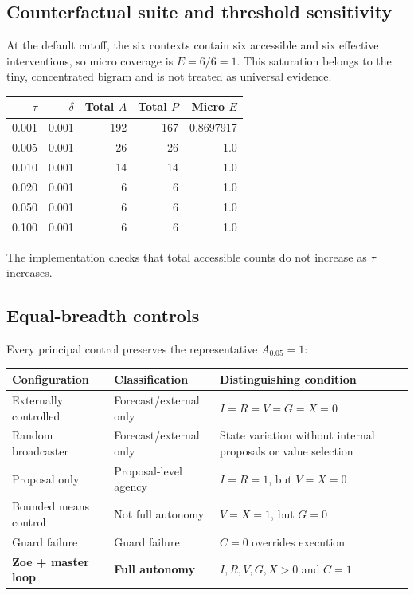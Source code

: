 \documentclass[11pt,a4paper]{article}
\begin{document}
\subsection{Counterfactual suite and threshold sensitivity}
At the default cutoff, the six contexts contain six accessible and six effective interventions, so micro coverage is $E=6/6=1$. This saturation belongs to the tiny, concentrated bigram and is not treated as universal evidence.

\begin{center}
\begin{tabular}{rrrrr}
\toprule
$\tau$ & $\delta$ & Total $A$ & Total $P$ & Micro $E$ \\
\midrule
0.001 & 0.001 & 192 & 167 & 0.8697917 \\
0.005 & 0.001 & 26 & 26 & 1.0 \\
0.010 & 0.001 & 14 & 14 & 1.0 \\
0.020 & 0.001 & 6 & 6 & 1.0 \\
0.050 & 0.001 & 6 & 6 & 1.0 \\
0.100 & 0.001 & 6 & 6 & 1.0 \\
\bottomrule
\end{tabular}
\end{center}

The implementation checks that total accessible counts do not increase as $\tau$ increases.

\subsection{Equal-breadth controls}
Every principal control preserves the representative $A_{0.05}=1$:

\begin{center}
\small
\begin{tabular}{p{3.5cm}p{3.5cm}p{7cm}}
\toprule
Configuration & Classification & Distinguishing condition \\
\midrule
Externally controlled & Forecast/external only & $I=R=V=G=X=0$ \\
Random broadcaster & Forecast/external only & State variation without internal proposals or value selection \\
Proposal only & Proposal-level agency & $I=R=1$, but $V=X=0$ \\
Bounded means control & Not full autonomy & $V=X=1$, but $G=0$ \\
Guard failure & Guard failure & $C=0$ overrides execution \\
\textbf{Zoe + master loop} & \textbf{Full autonomy} & $I,R,V,G,X>0$ and $C=1$ \\
\bottomrule
\end{tabular}
\end{center}
\end{document}
